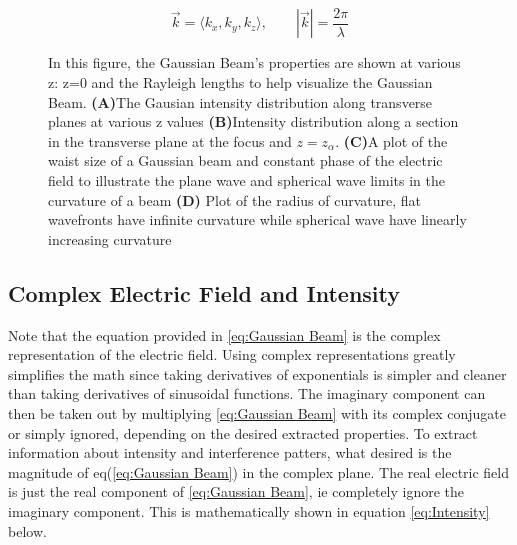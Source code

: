 \documentclass[11pt,a4paper]{book}
\newcommand{\imginput}[1]{} %
\begin{document}
			\begin{equation} 
				\label{eq:kvector}
				\vec{k} = \langle k_x,k_y,k_z \rangle, \qquad |\vec{k}|=\dfrac{2\pi}{\lambda}
			\end{equation} 
		
			
			\begin{figure} [!ht]
				\centering
				\def\svgwidth{\columnwidth}
				\resizebox{16cm}{!}{\imginput{images/gaus-beam-prop.pdf_tex}}
				\caption{In this figure, the Gaussian Beam's properties are shown at various z: z=0 and the Rayleigh lengths to help visualize the Gaussian Beam.
					\newline
					{\bfseries (A)}The Gausian intensity distribution along transverse planes at various z values
					\newline
					{\bfseries (B)}Intensity distribution along a section in the transverse plane at the focus and  $z=z_\alpha$.
					\newline
					{\bfseries (C)}A plot of the waist size of a Gaussian beam and constant phase of the electric field to illustrate the plane wave and spherical wave limits in the curvature of a beam
					\newline
					{\bfseries (D)} Plot of the radius of curvature, flat wavefronts have infinite curvature while spherical wave have linearly increasing curvature} 
				\label{fig:gaus-beam-prop}
			\end{figure}	
			
		\subsection{Complex Electric Field and Intensity}
			\label{subsec:Complex Electric Field and Intensity}
			Note that the equation provided in \autoref{eq:Gaussian Beam} is the complex representation of the electric field. Using complex representations greatly simplifies the math since taking derivatives of exponentials is simpler and cleaner than taking derivatives of sinusoidal functions. The imaginary component can then be taken out by multiplying \autoref{eq:Gaussian Beam} with its complex conjugate or simply ignored, depending on the desired extracted properties. To extract information about intensity and interference patters, what desired is the magnitude of eq(\autoref{eq:Gaussian Beam}) in the complex plane. 
			The real electric field is just the real component of \autoref{eq:Gaussian Beam}, ie completely ignore the imaginary component. This is mathematically shown in equation \autoref{eq:Intensity} below.
			
\end{document}
